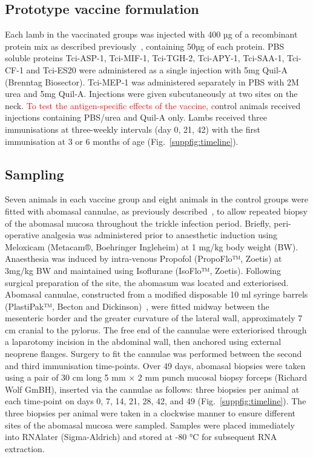 \documentclass[a4paper, hidelinks, 11pt]{article}
\begin{document}
\subsection{Prototype vaccine formulation}

Each lamb in the vaccinated groups was injected with 400 µg of a recombinant
protein mix as described previously~\supercite{Nisbet2013}, containing 50µg of
each protein. PBS soluble proteins Tci-ASP-1, Tci-MIF-1, Tci-TGH-2,
Tci-APY-1, Tci-SAA-1, Tci-CF-1 and Tci-ES20 were administered as a single
injection with 5mg Quil-A (Brenntag Biosector). Tci-MEP-1 was administered
separately in PBS with 2M urea and 5mg Quil-A. Injections were given
subcutaneously at two sites on the neck. \textcolor{red}{To test the antigen-specific effects of the vaccine, c}ontrol animals received injections
containing PBS/urea and Quil-A only. Lambs received three immunisations at
three-weekly intervals (day 0, 21, 42) with the first immunisation at 3 or 6
months of age (Fig.~\ref{suppfig:timeline}).

\subsection{Sampling}

Seven animals in each vaccine group and eight animals in the control groups
were fitted with abomasal cannulae, as previously described~\supercite{Huntley2004},
to allow repeated biopsy of the abomasal mucosa throughout the trickle
infection period. Briefly, peri-operative analgesia was administered prior to
anaesthetic induction using Meloxicam (Metacam®, Boehringer Ingleheim) at 1
mg/kg body weight (BW). Anaesthesia was induced by intra-venous Propofol
(PropoFlo™, Zoetis) at 3mg/kg BW and maintained using Isoflurane (IsoFlo™,
Zoetis). Following surgical preparation of the site, the abomasum was located
and exteriorised. Abomasal cannulae, constructed from a modified disposable
10 ml syringe barrels (PlastiPak™, Becton and Dickinson)~\supercite{Huntley2004},
were fitted midway between the mesenteric border and the greater curvature of
the lateral wall, approximately 7 cm cranial to the pylorus. The free end of
the cannulae were exteriorised through a laparotomy incision in the abdominal
wall, then anchored using external neoprene flanges. Surgery to fit the
cannulae was performed between the second and third immunisation time-points.
Over 49 days, abomasal biopsies were taken using a pair of 30 cm long 5 mm ×
2 mm punch mucosal biopsy forceps (Richard Wolf GmBH), inserted via the
cannulae as follows: three biopsies per animal at each time-point on days 0,
7, 14, 21, 28, 42, and 49 (Fig.~\ref{suppfig:timeline}). The three biopsies
per animal were taken in a clockwise manner to ensure different sites of the
abomasal mucosa were sampled. Samples were placed immediately into RNAlater
(Sigma-Aldrich) and stored at -80 °C for subsequent RNA extraction.
\end{document}
